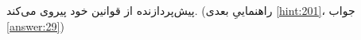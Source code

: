 \section{}
\paragraph{}\label{hint:327}
پیش‌پردازنده از قوانین خود پیروی می‌کند. (راهنماییِ بعدی \ref{hint:201}، جواب \ref{answer:29})